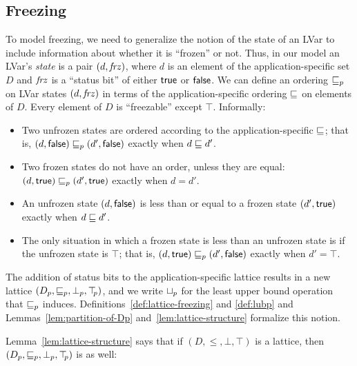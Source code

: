 \subsection{Freezing}

To model freezing, we need to generalize the notion of the state of an
LVar to include information about whether it is ``frozen'' or not.
Thus, in our model an LVar's \emph{state} is a pair
$(d, \mathit{frz})$, where $d$ is an element of the
application-specific set $D$ and $\mathit{frz}$ is a ``status bit'' of
either $\textsf{true}$ or $\textsf{false}$.  We can define an ordering
$\sqsubseteq_p$ on LVar states $(d, \mathit{frz})$ in terms of the
application-specific ordering $\sqsubseteq$ on elements of $D$.  Every
element of $D$ is ``freezable'' except $\top$.  Informally:
\begin{itemize}
\item Two unfrozen states are ordered according to the
  application-specific $\sqsubseteq$; that is, $(d, \textsf{false})
  \sqsubseteq_p (d', \textsf{false})$ exactly when $d \sqsubseteq d'$.
\item Two frozen states do not have an order, unless they are equal:
  $(d, \textsf{true}) \sqsubseteq_p (d', \textsf{true})$ exactly when
  $d = d'$.
\item An unfrozen state $(d, \textsf{false})$ is less than or
  equal to a frozen state $(d', \textsf{true})$ exactly when $d
  \sqsubseteq d'$.
\item The only situation in which a frozen state is less than an
  unfrozen state is if the unfrozen state is $\top$; that is,
  $(d, \textsf{true}) \sqsubseteq_p (d', \textsf{false})$ exactly when
  $d' = \top$.
\end{itemize}
The addition of status bits to the application-specific lattice
results in a new lattice $(D_p, \sqsubseteq_p, \bot_{p}, \top\hspace{-0.85mm}_{p})$, and we write
$ \sqcup_p $ for the least upper bound operation that $\sqsubseteq_p$ induces.
Definitions~\ref{def:lattice-freezing} and \ref{def:lubp} and
Lemmas~\ref{lem:partition-of-Dp}
and~\ref{lem:lattice-structure} formalize this notion.

\DefLatticeFreezing

\LemPartitionOfDp

\DefLubP

Lemma~\ref{lem:lattice-structure} says that if $(D, \leq, \bot, \top)$
is a lattice, then $(D_p, \sqsubseteq_p, \bot_{p}, \top\hspace{-0.85mm}_{p})$ is as well:

\LemLatticeStructure


